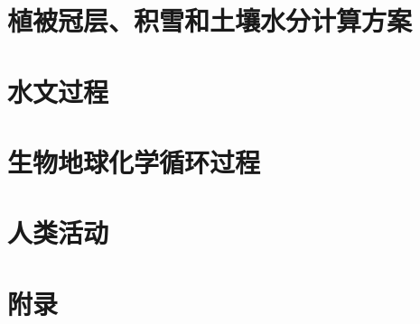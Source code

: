 \documentclass[a4paper,12pt,twoside]{report}
\begin{document}
\part{植被冠层、积雪和土壤水分计算方案}\label{part:SPC}




\part{水文过程}\label{part:hydro}

%





\part{生物地球化学循环过程}\label{part:BGC}






\part{人类活动}\label{part:human}





%
%
%

\clearpage
{} %
\part*{附录}

\appendix
\clearpage



\clearpage
\renewcommand{\bibname}{参考文献}



%
\end{document}
